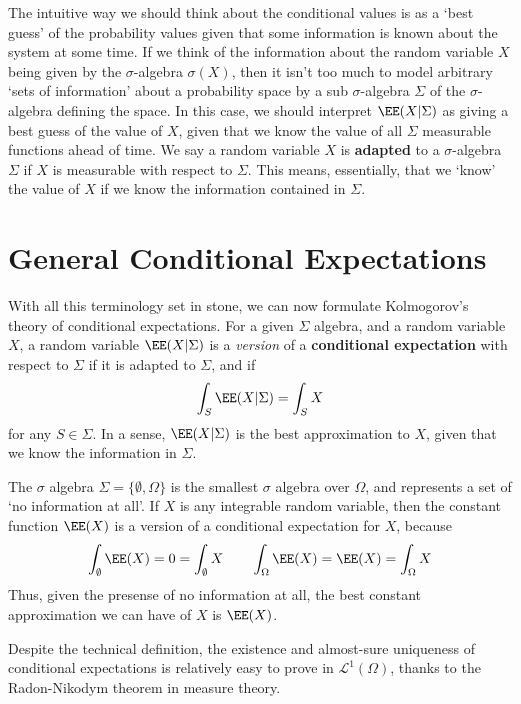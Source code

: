 The intuitive way we should think about the conditional values is as a `best guess' of the probability values given that some information is known about the system at some time. If we think of the information about the random variable $X$ being given by the $\sigma$-algebra $\sigma(X)$, then it isn't too much to model arbitrary `sets of information' about a probability space by a sub $\sigma$-algebra $\Sigma$ of the $\sigma$-algebra defining the space. In this case, we should interpret $\EE(X|\Sigma)$ as giving a best guess of the value of $X$, given that we know the value of all $\Sigma$ measurable functions ahead of time. We say a random variable $X$ is {\bf adapted} to a $\sigma$-algebra $\Sigma$ if $X$ is measurable with respect to $\Sigma$. This means, essentially, that we `know' the value of $X$ if we know the information contained in $\Sigma$.

\section{General Conditional Expectations}

With all this terminology set in stone, we can now formulate Kolmogorov's theory of conditional expectations. For a given $\Sigma$ algebra, and a random variable $X$, a random variable $\EE(X|\Sigma)$ is a {\it version} of a {\bf conditional expectation} with respect to $\Sigma$ if it is adapted to $\Sigma$, and if
%
\[ \int_S \EE(X|\Sigma) = \int_S X \]
%
for any $S \in \Sigma$. In a sense, $\EE(X|\Sigma)$ is the best approximation to $X$, given that we know the information in $\Sigma$.

\begin{example}
    The $\sigma$ algebra $\Sigma = \{ \emptyset, \Omega \}$ is the smallest $\sigma$ algebra over $\Omega$, and represents a set of `no information at all'. If $X$ is any integrable random variable, then the constant function $\EE(X)$ is a version of a conditional expectation for $X$, because
    \[ \int_\emptyset \EE(X) = 0 = \int_\emptyset X\ \ \ \ \ \ \int_\Omega \EE(X) = \EE(X) = \int_\Omega X \]
    Thus, given the presense of no information at all, the best constant approximation we can have of $X$ is $\EE(X)$.
\end{example}

Despite the technical definition, the existence and almost-sure uniqueness of conditional expectations is relatively easy to prove in $\mathcal{L}^1(\Omega)$, thanks to the Radon-Nikodym theorem in measure theory.

